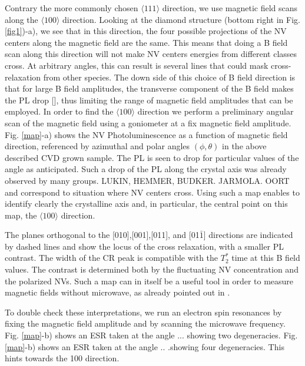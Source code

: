 \documentclass[9pt,twocolumn,twoside]{osajnl}
\begin{document}
Contrary the more commonly chosen $\langle 111 \rangle$ direction, we use magnetic field scans along the $\langle 100 \rangle$ direction. 
Looking at the diamond structure (bottom right in Fig.  \ref{fig1})-a), we see that in this direction, the four possible projections of the NV centers along the magnetic field are the same. This means that doing a B field scan along this direction will not make NV centers energies from different classes cross. At arbitrary angles, this can result is several lines that could mask cross-relaxation from other species. 
The down side of this choice of B field direction is that for large B field amplitudes, the transverse component of the B field makes the PL drop [], thus limiting the range of magnetic field amplitudes that can be employed.
In order to find the $\langle 100 \rangle$ direction we perform a preliminary angular scan of the magnetic field using a goniometer at a fix magnetic field amplitude.
Fig. \ref{map}-a)  shows the NV Photoluminescence as a function of magnetic field direction, referenced by azimuthal and polar angles $(\phi, \theta)$ in the above described CVD grown sample. The PL is seen to drop for particular values of the angle as anticipated.
Such a drop of the PL along the crystal axis was already observed by many groups. LUKIN, HEMMER, BUDKER. JARMOLA. OORT
\cite{van_oort_optically_1991, van_oort_cross-relaxation_1989, armstrong_nvnv_2010, jarmola_longitudinal_2015, akhmedzhanov_microwave-free_2017, akhmedzhanov_magnetometry_2019, holliday_optical_1989, choi_depolarization_2017} and correspond to situation where NV centers cross. 
Using such a map enables to identify clearly the crystalline axis and, in particular, the central point on this map, the $\langle 100 \rangle$ direction.

The planes orthogonal to the [010],[001],[011], and [01$\bar 1$] directions are indicated by dashed lines and show the locus of the cross relaxation, with a smaller PL contrast. 
The width of the CR peak is compatible with the $T_2^*$ time at this B field values. The contrast is determined both by the fluctuating NV concentration and the polarized NVs.
Such a map can in itself be a useful tool in order to measure magnetic fields without microwave, as already pointed out in \cite{}. 

To double check these interpretations, we run an electron spin resonances by fixing the magnetic field amplitude and by scanning the microwave frequency. 
Fig. \ref{map}-b) shows an ESR taken at the angle ... showing two degeneracies.
Fig. \ref{map}-b) shows an ESR taken at the angle .. .showing four degeneracies. This hints towards the 100 direction. 
\end{document}

